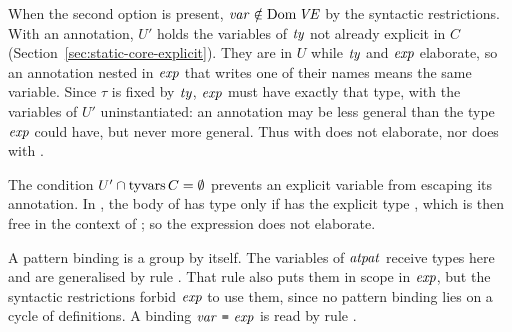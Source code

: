 \begin{rulecomments}
 When the second option is present,
$\mathit{var} \notin \mathrm{Dom}\,\mathit{VE}$ by the syntactic restrictions. With an annotation, $U'$ holds the variables of $\mathit{ty}$
not already explicit in $C$ (Section~\ref{sec:static-core-explicit}). They are
in $U$ while $\mathit{ty}$ and $\mathit{exp}$ elaborate, so an annotation nested in $\mathit{exp}$
that writes one of their names means the same variable. %
Since $\tau$ is fixed by $\mathit{ty}$, $\mathit{exp}$ must have exactly that type, with the
variables of $U'$ uninstantiated: an annotation may be less general than the
type $\mathit{exp}$ could have, but never more general. Thus  with
 does not elaborate, nor does  with
.

The condition $U' \cap \mathrm{tyvars}\, C = \emptyset$ prevents an explicit variable
from escaping its annotation. %
In , the body of  has type
 only if  has the explicit type , which is then free in
the context of ; so the expression does not elaborate.

 A pattern binding is a group by itself. The variables
of $\mathit{atpat}$ receive types here and are generalised by rule
. That rule also puts them in scope in $\mathit{exp}$, but the
syntactic restrictions forbid $\mathit{exp}$ to use them, since no pattern binding
lies on a cycle of definitions. %
A binding $\mathit{var}\ \textnormal{\texttt{=}}\ \mathit{exp}$ is read by rule .
\end{rulecomments}















